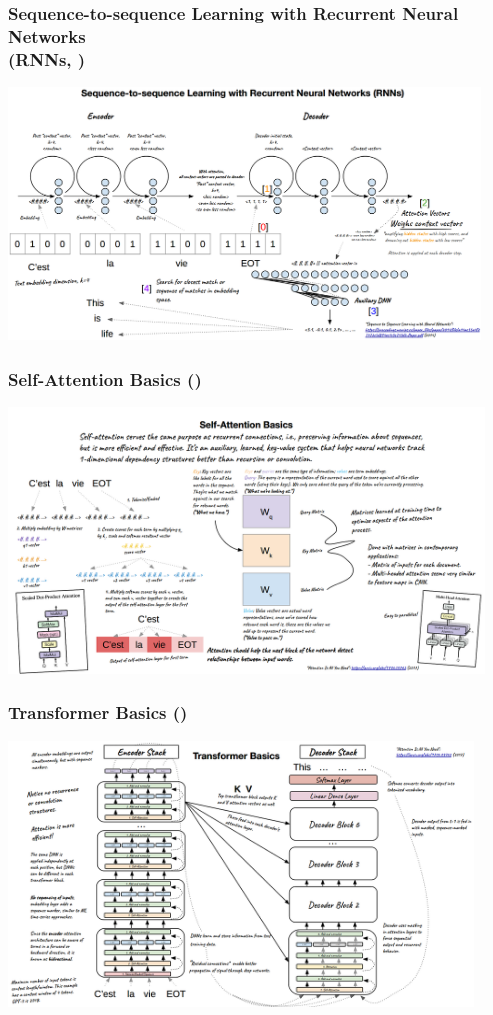 \documentclass[11pt,
               aspectratio=169,
               hyperref={colorlinks}
               ]{beamer}
\begin{document}
		\begin{frame}
			\frametitle{\small{Sequence-to-sequence Learning with Recurrent Neural Networks\\ (RNNs, \cite{NIPS2014_a14ac55a})}}
			\centering
			\includegraphics[height=190pt]{../img/rnn.png}
		\end{frame}		

		\begin{frame}
			\frametitle{Self-Attention Basics (\cite{NIPS2017_3f5ee243})}
			\centering
			\includegraphics[height=200pt]{../img/attn.png}
		\end{frame}	
		
		\begin{frame}
			\frametitle{Transformer Basics (\cite{NIPS2017_3f5ee243})}
			\centering
			\includegraphics[height=200pt]{../img/trans.png}
		\end{frame}
		
\end{document}
